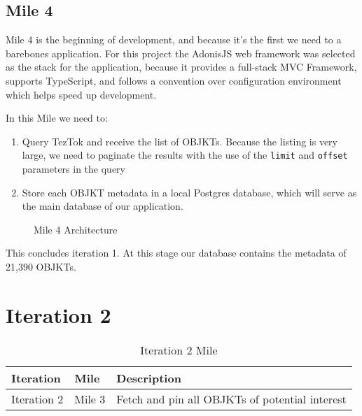 \subsection {Mile 4}

Mile 4 is the beginning of development, and because it's the first we need to a barebones application. For this project the AdonisJS web framework was selected as the stack for the application, because it provides a full-stack MVC Framework, supports TypeScript, and follows a convention over configuration environment which helps speed up development.

In this Mile we need to:

\begin{enumerate}
	\item Query TezTok and receive the list of OBJKTs. Because the listing is very large, we need to paginate the results with the use of the \texttt{limit} and \texttt{offset} parameters in the query
	\item Store each OBJKT metadata in a local Postgres database, which will serve as the main database of our application.
\end{enumerate}



\begin{figure}[h]
    \centering
    
    \caption[Mile 4 Architecture]{Mile 4 Architecture}
    \label{fig:mile4-arch}
\end{figure}


This concludes iteration 1. At this stage our database contains the metadata of 21,390 OBJKTs.


\section {Iteration 2}


\begin{table}[h]
\footnotesize
\centering
\begin{tabular}{|l|c|l|}
\hline
\textbf{Iteration}        & \multicolumn{1}{l|}{\textbf{Mile}} & \textbf{Description}                                         \\ \hline
Iteration 2                  & Mile 3                              & Fetch and pin all OBJKTs of potential interest               \\ \hline
\end{tabular}
\caption{Iteration 2 Mile}
\end{table}


